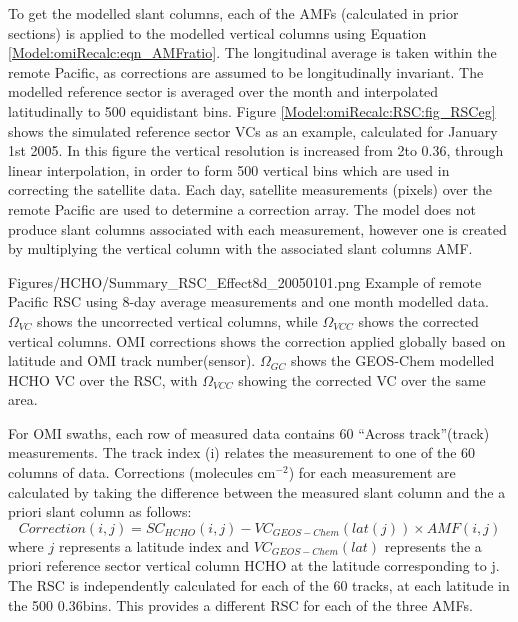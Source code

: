     To get the modelled slant columns, each of the AMFs (calculated in prior sections) is applied to the modelled vertical columns using Equation \ref{Model:omiRecalc:eqn_AMFratio}.
    The longitudinal average is taken within the remote Pacific, as corrections are assumed to be longitudinally invariant.
    The modelled reference sector is averaged over the month and interpolated latitudinally to 500 equidistant bins.
    Figure \ref{Model:omiRecalc:RSC:fig_RSCeg} shows the simulated reference sector VCs as an example, calculated for January 1st 2005.
    In this figure the vertical resolution is increased from 2\degr to 0.36\degr, through linear interpolation, in order to form 500 vertical bins which are used in correcting the satellite data.
    Each day, satellite measurements (pixels) over the remote Pacific are used to determine a correction array.
    The model does not produce slant columns associated with each measurement, however one is created by multiplying the vertical column with the associated slant columns AMF.
    
    {Figures/HCHO/Summary_RSC_Effect8d_20050101.png}
    {%
      Example of remote Pacific RSC using 8-day average measurements and one month modelled data.
      $\Omega_{VC}$ shows the uncorrected vertical columns, while $\Omega_{VCC}$ shows the corrected vertical columns.
      OMI corrections shows the correction applied globally based on latitude and OMI track number(sensor).
      $\Omega_{GC}$ shows the GEOS-Chem modelled HCHO VC over the RSC, with $\Omega_{VCC}$ showing the corrected VC over the same area.
    }
    {\label{Model:omiRecalc:RSC:fig_RSCeg}}
    
    
    For OMI swaths, each row of measured data contains 60 ``Across track''(track) measurements.
    The track index (i) relates the measurement to one of the 60 columns of data.
    Corrections (molecules cm$^{-2}$) for each measurement are calculated by taking the difference between the measured slant column and the a priori slant column as follows:
    \begin{equation} \label{Model:omiRecalc:eqn_RSC}
      Correction(i,j) = SC_{HCHO}(i,j) - VC_{GEOS-Chem}(lat(j)) \times {AMF}(i,j)
    \end{equation}
    where $j$ represents a latitude index and $VC_{GEOS-Chem}(lat)$ represents the a priori reference sector vertical column HCHO at the latitude corresponding to j.
    The RSC is independently calculated for each of the 60 tracks, at each latitude in the 500 0.36\degr bins.
    This provides a different RSC for each of the three AMFs.
    
